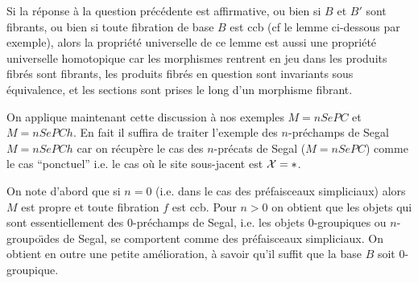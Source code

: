 \documentclass[12pt]{article}
\newcommand{\Xx}{{\cal X}}
\begin{document}
Si la r\'eponse \`a la question pr\'ec\'edente est affirmative,
ou bien si $B$
et $B'$ sont fibrants, ou bien si toute fibration de base $B$
est ccb (cf le lemme ci-dessous par exemple), alors la propri\'et\'e
universelle
de ce lemme est aussi une propri\'et\'e universelle homotopique car
les morphismes rentrent en jeu dans les produits
fibr\'es sont fibrants,
les produits fibr\'es en question sont invariants sous \'equivalence,
et les sections sont prises le long d'un morphisme fibrant.

On applique maintenant cette discussion \`a nos exemples $M=nSePC$ et
$M=nSePCh$. En fait il suffira de traiter l'exemple des $n$-pr\'echamps de
Segal $M=nSePCh$ car on r\'ecup\`ere le cas des $n$-pr\'ecats
de Segal ($M=nSePC$)
comme le cas ``ponctuel'' i.e. le cas o\`u le site sous-jacent est
$\Xx =\ast$.

On note d'abord que si $n=0$ (i.e. dans le cas des pr\'efaisceaux
simpliciaux)
alors $M$ est propre et toute fibration $f$ est ccb. Pour $n>0$ on
obtient que
les objets qui sont essentiellement des $0$-pr\'echamps de Segal, i.e. les
objets $0$-groupiques ou $n$-groupo\"{\i}des de Segal, se comportent
comme des
pr\'efaisceaux simpliciaux. On obtient en outre une petite am\'elioration,
\`a savoir qu'il
suffit que la base $B$ soit $0$-groupique.
\end{document}

